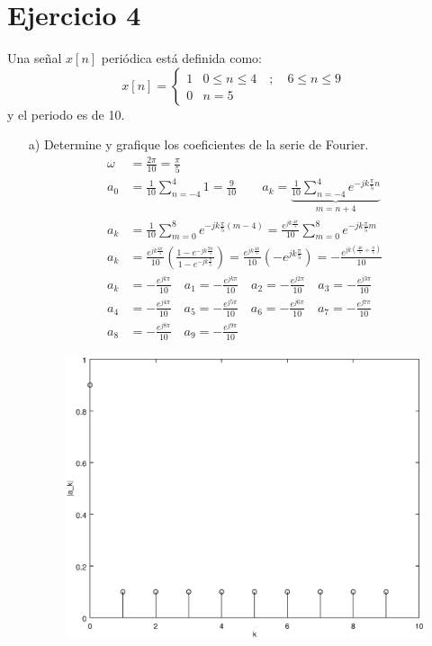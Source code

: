 \documentclass[a4paper,12pt]{article}
\begin{document}
\section{Ejercicio 4}
Una señal $x[n]$ periódica está definida como:
\[ x[n]=\begin{cases}
            1 & 0 \leq n \leq 4 \quad;\quad 6 \leq n \leq 9 \\
            0 & n = 5
        \end{cases}
 \]
y el periodo es de 10.
\begin{itemize}
    \item[a)] Determine y grafique los coeficientes de la serie de Fourier.
        \[ \begin{split}
            \omega &= \frac{2\pi}{10} = \frac{\pi}{5} \\
            a_0 &= \frac{1}{10}\sum_{n = -4}^{4}1 = \frac{9}{10} \qquad a_k = \underbrace{\frac{1}{10}\sum_{n=-4}^{4}e^{-jk\frac{\pi}{5}n}}_{m = n + 4} \\
            a_k &= \frac{1}{10}\sum_{m=0}^{8}e^{-jk\frac{\pi}{5}(m - 4)} = \frac{e^{jk\frac{4\pi}{5}}}{10}\sum_{m=0}^{8}e^{-jk\frac{\pi}{5}m} \\
            a_k &= \frac{e^{jk\frac{4\pi}{5}}}{10}\left(\frac{1 - e^{-jk\frac{9\pi}{5}}}{1 - e^{-jk\frac{\pi}{5}}}\right) = \frac{e^{jk\frac{4\pi}{5}}}{10}\left(- e^{jk\frac{\pi}{5}}\right) = -\frac{e^{jk\left(\frac{4\pi}{5} + \frac{\pi}{5}\right)}}{10} \\
            a_k &= -\frac{e^{jk\pi}}{10} \quad a_1 = -\frac{e^{jk\pi}}{10} \quad a_2 = -\frac{e^{j2\pi}}{10} \quad a_3 = -\frac{e^{j3\pi}}{10} \\
            a_4 &= -\frac{e^{j4\pi}}{10} \quad a_5 = -\frac{e^{j5\pi}}{10} \quad a_6 = -\frac{e^{j6\pi}}{10} \quad a_7 = -\frac{e^{j7\pi}}{10} \\
            a_8 &= -\frac{e^{j8\pi}}{10} \quad a_9 = -\frac{e^{j9\pi}}{10}
        \end{split} \]
        \begin{multicols}{2}
            \begin{figure}[H]
                \begin{center}
                    \includegraphics[width= \linewidth]{absAk}

\end{center}
\end{figure}
\end{multicols}
\end{itemize}
\end{document}

